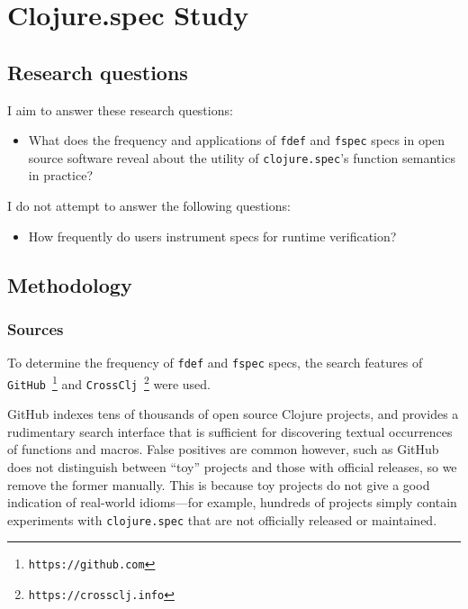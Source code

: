 \chapter{Clojure.spec Study}

\section{Research questions}

I aim to answer these research questions:

\begin{itemize}
  \item What does the frequency and applications of \texttt{fdef} and \texttt{fspec} specs
    in open source software reveal about the utility of \texttt{clojure.spec}'s
    function semantics in practice?
\end{itemize}

I do not attempt to answer the following questions:

\begin{itemize}
  \item How frequently do users instrument specs for runtime verification?
\end{itemize}

\section{Methodology}

\subsection{Sources}

To determine the frequency of \texttt{fdef} and \texttt{fspec} specs,
the search features of \texttt{GitHub}~\footnote{\texttt{https://github.com}} and 
\texttt{CrossClj}~\footnote{\texttt{https://crossclj.info}} were used.

GitHub indexes tens of thousands of open source Clojure projects, and provides
a rudimentary search interface that is sufficient for discovering textual occurrences 
of functions and macros. False positives are common however, such as
GitHub does not distinguish
between ``toy'' projects and those with official releases, so we remove the former manually.
This is because toy projects do not give a good indication of real-world idioms---for example,
hundreds of projects simply contain experiments with \texttt{clojure.spec} that
are not officially released or maintained.


